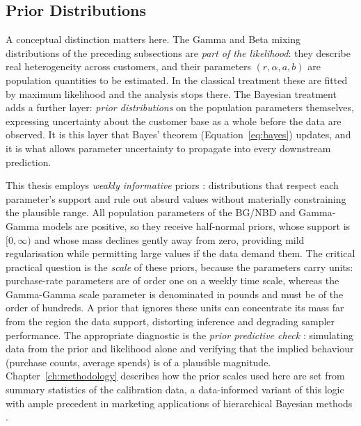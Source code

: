 \documentclass[12pt, a4paper, oneside]{report}
\begin{document}
\subsection{Prior Distributions}
\label{sec:priors-theory}

A conceptual distinction matters here. The Gamma and Beta mixing distributions of the preceding subsections are \emph{part of the likelihood}: they describe real heterogeneity across customers, and their parameters $(r, \alpha, a, b)$ are population quantities to be estimated. In the classical treatment these are fitted by maximum likelihood and the analysis stops there. The Bayesian treatment adds a further layer: \emph{prior distributions} on the population parameters themselves, expressing uncertainty about the customer base as a whole before the data are observed. It is this layer that Bayes' theorem (Equation~\eqref{eq:bayes}) updates, and it is what allows parameter uncertainty to propagate into every downstream prediction.

This thesis employs \emph{weakly informative} priors \parencite{gelman2013}: distributions that respect each parameter's support and rule out absurd values without materially constraining the plausible range. All population parameters of the BG/NBD and Gamma-Gamma models are positive, so they receive half-normal priors, whose support is $[0, \infty)$ and whose mass declines gently away from zero, providing mild regularisation while permitting large values if the data demand them. The critical practical question is the \emph{scale} of these priors, because the parameters carry units: purchase-rate parameters are of order one on a weekly time scale, whereas the Gamma-Gamma scale parameter is denominated in pounds and must be of the order of hundreds. A prior that ignores these units can concentrate its mass far from the region the data support, distorting inference and degrading sampler performance. The appropriate diagnostic is the \emph{prior predictive check} \parencite{gelman2013}: simulating data from the prior and likelihood alone and verifying that the implied behaviour (purchase counts, average spends) is of a plausible magnitude. Chapter~\ref{ch:methodology} describes how the prior scales used here are set from summary statistics of the calibration data, a data-informed variant of this logic with ample precedent in marketing applications of hierarchical Bayesian methods \parencite{rossi2005}.
\end{document}
